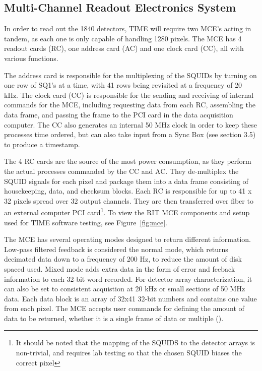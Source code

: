 \documentclass[manuscript]{aastex}
\begin{document}
\subsection{\textbf{Multi-Channel Readout Electronics System}}

In order to read out the 1840 detectors, TIME will require two MCE's acting in tandem, as each one is only capable of handling 1280 pixels. The MCE has 4 readout cards (RC), one address card (AC) and one clock card (CC), all with various functions.

The address card is responsible for the multiplexing of the SQUIDs by turning on one row of SQ1's at a time, with 41 rows being revisited at a frequency of 20 kHz. The clock card (CC) is responsible for the sending and receiving of internal commands for the MCE, including requesting data from each RC, assembling the data frame, and passing the frame to the PCI card in the data acquisition computer. The CC also generates an internal 50 MHz clock in order to keep these processes time ordered, but can also take input from a Sync Box (see section 3.5) to produce a timestamp.

The 4 RC cards are the source of the most power consumption, as they perform the actual processes commanded by the CC and AC. They de-multiplex the SQUID signals for each pixel and package them into a data frame consisting of housekeeping, data, and checksum blocks. Each RC is responsible for up to 41 x 32 pixels spread over 32 output channels. They are then transferred over fiber to an external computer PCI card\footnote{It should be noted that the mapping of the SQUIDS to the detector arrays is non-trivial, and requires lab testing so that the chosen SQUID biases the correct pixel}. To view the RIT MCE components and setup used for TIME software testing, see Figure~\ref{fig:mce}.

The MCE has several operating modes designed to return different information. Low-pass filtered feedback is considered the normal mode, which returns decimated data down to a frequency of 200 Hz, to reduce the amount of disk spaced used. Mixed mode adds extra data in the form of error and feeback information to each 32-bit word recorded. For detector array characterization, it can also be set to consistent acquistion at 20 kHz or small sections of 50 MHz data. Each data block is an array of 32x41 32-bit numbers and contains one value from each pixel. The MCE accepts user commands for defining the amount of data to be returned, whether it is a single frame of data or multiple (\cite{Battistelli2008}). 
\end{document}

